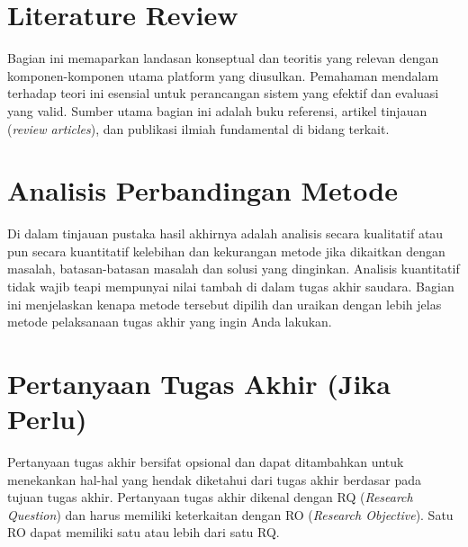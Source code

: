 
\section{Literature Review}
\label{sec:literature_review}

Bagian ini memaparkan landasan konseptual dan teoritis yang relevan dengan komponen-komponen utama platform yang diusulkan. Pemahaman mendalam terhadap teori ini esensial untuk perancangan sistem yang efektif dan evaluasi yang valid. Sumber utama bagian ini adalah buku referensi, artikel tinjauan (\textit{review articles}), dan publikasi ilmiah fundamental di bidang terkait.


\section{Analisis Perbandingan Metode}
\label{sec:analisis_metode_revised}

Di dalam tinjauan pustaka hasil akhirnya adalah analisis secara kualitatif atau pun secara kuantitatif kelebihan dan kekurangan metode jika dikaitkan dengan masalah, batasan-batasan masalah dan solusi yang dinginkan. Analisis kuantitatif tidak wajib teapi mempunyai nilai tambah di dalam tugas akhir saudara. Bagian ini menjelaskan kenapa metode tersebut dipilih dan uraikan dengan lebih jelas metode pelaksanaan tugas akhir yang ingin Anda lakukan. 

\section{Pertanyaan Tugas Akhir (Jika Perlu)}
\label{sec:pertanyaan_ta_revised}

Pertanyaan tugas akhir bersifat opsional dan dapat ditambahkan untuk menekankan hal-hal yang hendak diketahui dari tugas akhir berdasar pada tujuan tugas akhir. Pertanyaan tugas akhir dikenal dengan RQ (\textit{Research Question}) dan harus memiliki keterkaitan dengan RO (\textit{Research Objective}). Satu RO dapat memiliki satu atau lebih dari satu RQ.
